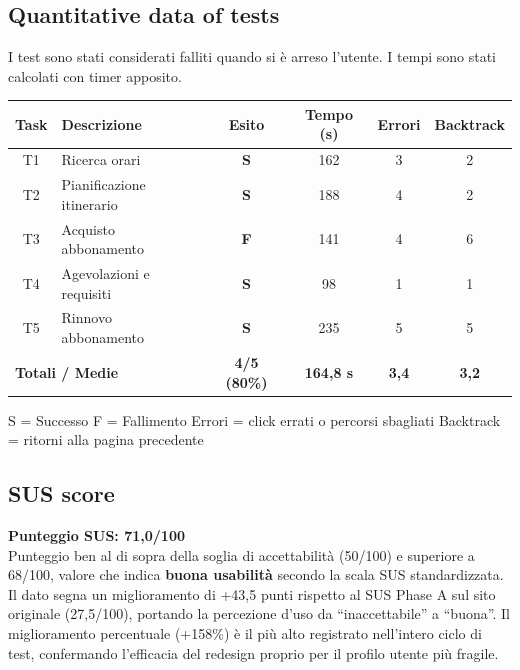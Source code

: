 ﻿\documentclass[11pt,a4paper]{article}
\begin{document}
\subsection*{Quantitative data of tests}
\begin{tcolorbox}[base]
I test sono stati considerati falliti quando si è arreso l'utente.
I tempi sono stati calcolati con timer apposito.
\begin{center}
\renewcommand{\arraystretch}{1.4}
\begin{tabular}{clcccc}
\toprule
\textbf{Task} & \textbf{Descrizione} &
\textbf{Esito} & \textbf{Tempo (s)} &
\textbf{Errori} & \textbf{Backtrack} \\
\midrule
T1 & Ricerca orari             & \textbf{S} & 162 & 3 & 2 \\
T2 & Pianificazione itinerario & \textbf{S} & 188 & 4 & 2 \\
T3 & Acquisto abbonamento      & \textbf{F} & 141 & 4 & 6 \\
T4 & Agevolazioni e requisiti  & \textbf{S} & 98  & 1 & 1 \\
T5 & Rinnovo abbonamento       & \textbf{S} & 235 & 5 & 5 \\
\midrule
\multicolumn{2}{l}{\textbf{Totali / Medie}} &
\textbf{4/5 (80\%)} & \textbf{164,8 s} &
\textbf{3,4} & \textbf{3,2} \\
\bottomrule
\end{tabular}
\end{center}

\vspace{0.3cm}
\small S = Successo \quad F = Fallimento \quad
Errori = click errati o percorsi sbagliati \quad
Backtrack = ritorni alla pagina precedente
\end{tcolorbox}

\subsection*{SUS score}
\begin{tcolorbox}[base]
\textbf{Punteggio SUS: 71,0/100}\\[0.2cm]
\small Punteggio ben al di sopra della soglia di accettabilità
(50/100) e superiore a 68/100, valore che indica \textbf{buona
usabilità} secondo la scala SUS standardizzata. Il dato segna
un miglioramento di +43,5 punti rispetto al SUS Phase A sul sito
originale (27,5/100), portando la percezione d'uso da
``inaccettabile'' a ``buona''. Il miglioramento percentuale
(+158\%) è il più alto registrato nell'intero ciclo di test,
confermando l'efficacia del redesign proprio per il profilo
utente più fragile.
\end{tcolorbox}
\end{document}
